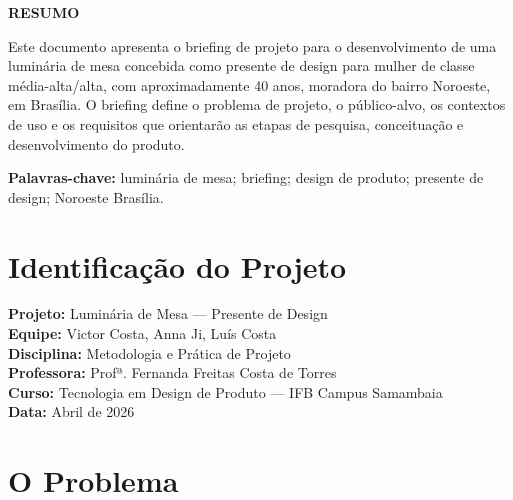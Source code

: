\documentclass[
  12pt,
  a4paper,
  oneside,
  brazil
]{article}
\let\oldsection\section
\renewcommand{\section}{\clearpage\oldsection}
\begin{document}
\clearpage
\thispagestyle{empty}
\begin{center}
  {\normalsize\bfseries RESUMO}
\end{center}

\vspace{1em}
\noindent
Este documento apresenta o briefing de projeto para o desenvolvimento de uma
luminária de mesa concebida como presente de design para mulher de classe
média-alta/alta, com aproximadamente 40 anos, moradora do bairro Noroeste, em
Brasília. O briefing define o problema de projeto, o público-alvo, os contextos de
uso e os requisitos que orientarão as etapas de pesquisa, conceituação e
desenvolvimento do produto.

\vspace{1em}
\noindent\textbf{Palavras-chave:} luminária de mesa; briefing; design de produto;
presente de design; Noroeste Brasília.

\clearpage
\thispagestyle{empty}
\tableofcontents


\section{Identificação do Projeto}

\noindent\textbf{Projeto:} Luminária de Mesa --- Presente de Design\\[0.3em]
\noindent\textbf{Equipe:} Victor Costa, Anna Ji, Luís Costa\\[0.3em]
\noindent\textbf{Disciplina:} Metodologia e Prática de Projeto\\[0.3em]
\noindent\textbf{Professora:} Profª. Fernanda Freitas Costa de Torres\\[0.3em]
\noindent\textbf{Curso:} Tecnologia em Design de Produto --- IFB Campus Samambaia\\[0.3em]
\noindent\textbf{Data:} Abril de 2026

\section{O Problema}
\end{document}
